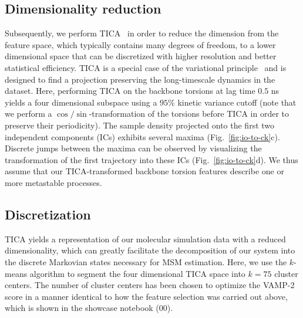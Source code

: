 \documentclass[9pt,tutorial]{livecoms}
\begin{document}
\subsection{Dimensionality reduction}

Subsequently, we perform TICA~\cite{tica,kinetic-maps} in order to reduce the dimension from the feature space, which typically contains many degrees of freedom, to a lower dimensional space that can be discretized with higher resolution and better statistical efficiency. TICA is a special case of the variational principle~\cite{noe-vac,nueske-vamk} and is designed to find a projection preserving the long-timescale dynamics in the dataset. Here, performing TICA on the backbone torsions at lag time $0.5$ ns yields a four dimensional subspace using a $95\%$ kinetic variance cutoff (note that we perform a $\cos/\sin$-transformation of the torsions before TICA in order to preserve their periodicity).
The sample density projected onto the first two independent components (ICs) exhibits several maxima (Fig.~\ref{fig:io-to-ck}c).
Discrete jumps between the maxima can be observed by visualizing the transformation of the first trajectory into these ICs (Fig.~\ref{fig:io-to-ck}d).
We thus assume that our TICA-transformed backbone torsion features describe one or more metastable processes.

\subsection{Discretization}
TICA yields a representation of our molecular simulation data with a reduced dimensionality, which can greatly facilitate the decomposition of our system into the discrete Markovian states necessary for MSM estimation. Here, we use the $k$-means algorithm to segment the four dimensional TICA space into $k=75$ cluster centers. The number of cluster centers has been chosen to optimize the VAMP-2 score in a manner identical to how the feature selection was carried out above, which is shown in the showcase notebook (00).
\end{document}
